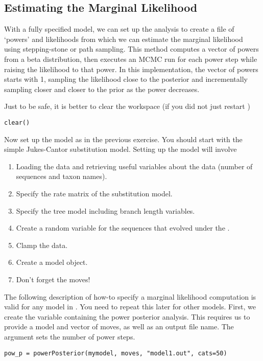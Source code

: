 \bigskip
\subsection{Estimating the Marginal Likelihood}

With a fully specified model, we can set up the  analysis to create a file of `powers' and likelihoods from which we can estimate the marginal likelihood using stepping-stone or path sampling. 
This method computes a vector of powers from a beta distribution, then executes an MCMC run for each power step while raising the likelihood to that power. In this implementation, the vector of powers starts with 1, sampling the likelihood close to the posterior and incrementally sampling closer and closer to the prior as the power decreases. 




Just to be safe, it is better to clear the workspace (if you did not just restart \RevBayes)
{\tt \begin{snugshade*}
\begin{lstlisting}
clear()
\end{lstlisting}
\end{snugshade*}}

Now set up the model as in the previous exercise. You should start with the simple Jukes-Cantor substitution model. Setting up the model will involve
\begin{enumerate}
\item Loading the data and retrieving useful variables about the data (\EG number of sequences and taxon names).
\item Specify the rate matrix of the substitution model.
\item Specify the tree model including branch length variables.
\item Create a random variable for the sequences that evolved under the .
\item Clamp the data.
\item Create a model object.
\item Don't forget the moves!
\end{enumerate}

The following description of how-to specify a marginal likelihood computation is valid for any model in \RevBayes.
You need to repeat this later for other models.
First, we create the variable containing the power posterior analysis. 
This requires us to provide a model and vector of moves, as well as an output file name. 
The  argument sets the number of power steps.
{\tt \begin{snugshade*}
\begin{lstlisting}
pow_p = powerPosterior(mymodel, moves, "model1.out", cats=50) 
\end{lstlisting}
\end{snugshade*}}

